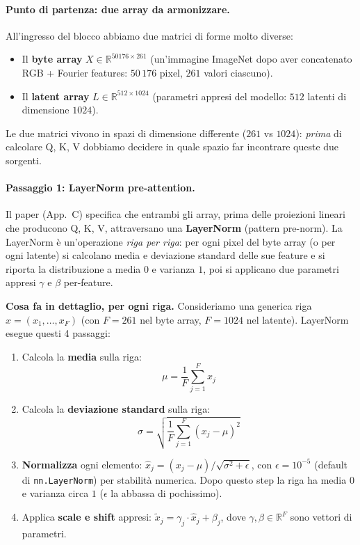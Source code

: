 \documentclass[
  11pt,
]{article}
\begin{document}
\paragraph{Punto di partenza: due array da armonizzare.} All'ingresso del blocco abbiamo due matrici di forme molto diverse:

\begin{itemize}\setlength\itemsep{0.2em}
\item Il \textbf{byte array} $X \in \mathbb{R}^{50176 \times 261}$ (un'immagine ImageNet dopo aver concatenato RGB + Fourier features: $50\,176$ pixel, $261$ valori ciascuno).
\item Il \textbf{latent array} $L \in \mathbb{R}^{512 \times 1024}$ (parametri appresi del modello: $512$ latenti di dimensione $1024$).
\end{itemize}

Le due matrici vivono in spazi di dimensione differente ($261$ vs $1024$): \emph{prima} di calcolare Q, K, V dobbiamo decidere in quale spazio far incontrare queste due sorgenti.

\paragraph{Passaggio 1: LayerNorm pre-attention.} Il paper (App.\ C) specifica che entrambi gli array, prima delle proiezioni lineari che producono Q, K, V, attraversano una \textbf{LayerNorm} (pattern pre-norm). La LayerNorm è un'operazione \emph{riga per riga}: per ogni pixel del byte array (o per ogni latente) si calcolano media e deviazione standard delle sue feature e si riporta la distribuzione a media $0$ e varianza $1$, poi si applicano due parametri appresi $\gamma$ e $\beta$ per-feature.

\medskip
\textbf{Cosa fa in dettaglio, per ogni riga.} Consideriamo una generica riga $x = (x_1, \ldots, x_F)$ (con $F = 261$ nel byte array, $F = 1024$ nel latente). LayerNorm esegue questi 4 passaggi:

\begin{enumerate}\setlength\itemsep{0.2em}
\item Calcola la \textbf{media} sulla riga:
\[
\mu = \frac{1}{F}\sum_{j=1}^{F} x_j
\]
\item Calcola la \textbf{deviazione standard} sulla riga:
\[
\sigma = \sqrt{\frac{1}{F}\sum_{j=1}^{F} (x_j - \mu)^2}
\]
\item \textbf{Normalizza} ogni elemento: $\hat{x}_j = (x_j - \mu)/\sqrt{\sigma^2 + \epsilon}$, con $\epsilon = 10^{-5}$ (default di \texttt{nn.LayerNorm}) per stabilità numerica. Dopo questo step la riga ha media $0$ e varianza circa $1$ ($\epsilon$ la abbassa di pochissimo).
\item Applica \textbf{scale e shift} appresi: $\tilde{x}_j = \gamma_j \cdot \hat{x}_j + \beta_j$, dove $\gamma, \beta \in \mathbb{R}^F$ sono vettori di parametri.
\end{enumerate}
\end{document}
